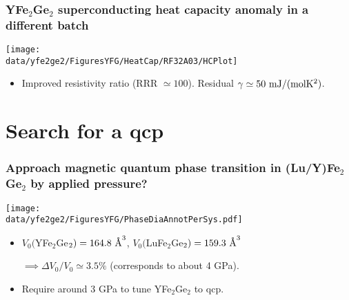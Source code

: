 \begin{frame}[label=YFGHeatCap]
\frametitle{YFe$_2$Ge$_2$ superconducting heat capacity anomaly in a
 different batch}
\centerline{\texttt{[image: \\data/yfe2ge2/FiguresYFG/HeatCap/RF32A03/HCPlot]}}

\begin{itemize}
\item 
Improved resistivity ratio (RRR $\simeq 100$).
Residual $\gamma \simeq 50~{\rm mJ/(mol K^2)}$.


\end{itemize}

\end{frame}




\section{Search for a qcp}
\begin{frame}[label=YFGIntro2b]
\frametitle{Approach magnetic quantum phase transition in
  (Lu/Y)Fe$_2$Ge$_2$ by applied pressure?}
\centerline{\texttt{[image: \\data/yfe2ge2/FiguresYFG/PhaseDiaAnnotPerSys.pdf]}}

\begin{itemize}
\item
$V_0 ($YFe$_2$Ge$_2) = 164.8 ~\mbox{\AA}^3$, $V_0 ($LuFe$_2$Ge$_2) =
159.3 ~\mbox{\AA}^3$ 

\hfill $\implies \Delta V_0/V_0 \simeq 3.5 \%$
(corresponds to about 4 GPa).

\item Require around 3 GPa to tune YFe$_2$Ge$_2$ to qcp.
\end{itemize}
\end{frame}



